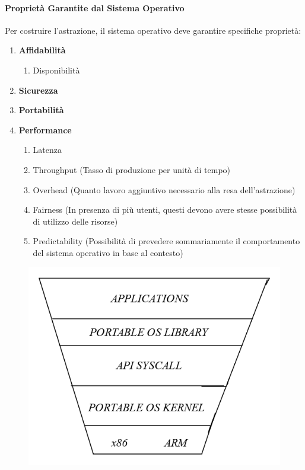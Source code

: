 \documentclass{article}
\begin{document}
\paragraph{Proprietà Garantite dal Sistema Operativo} Per costruire l'astrazione, il sistema operativo deve garantire specifiche proprietà:

\begin{enumerate}
    \item \textbf{Affidabilità}
    \begin{enumerate}
        \item Disponibilità
    \end{enumerate}
    \item \textbf{Sicurezza}
    \item \textbf{Portabilità}
    \newpage
    \item \textbf{Performance}
    \begin{enumerate}
        \item Latenza
        \item Throughput (Tasso di produzione per unità di tempo)
        \item Overhead (Quanto lavoro aggiuntivo necessario alla resa dell'astrazione)
        \item Fairness (In presenza di più utenti, questi devono avere stesse possibilità di utilizzo delle risorse)
        \item Predictability (Possibilità di prevedere sommariamente il comportamento del sistema operativo in base al contesto)
    \end{enumerate}
\end{enumerate}

\begin{figure}[htbp]
        \center
        \includegraphics[scale=0.375]{img/stack_os.png}
    \end{figure}
\end{document}
